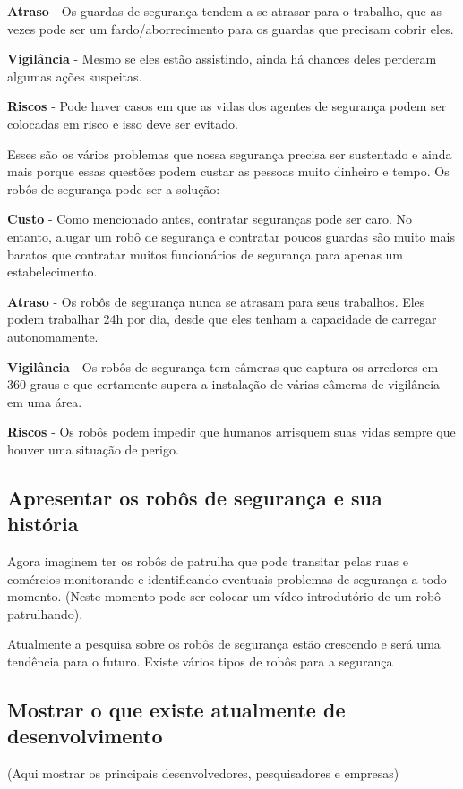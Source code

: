 \documentclass[12pt,a4paper]{article}
\begin{document}
    \textbf{Atraso} - Os guardas de segurança tendem a se atrasar para o trabalho, que as vezes pode ser um fardo/aborrecimento para os guardas que precisam cobrir eles.

    \textbf{Vigilância} - Mesmo se eles estão assistindo, ainda há chances deles perderam algumas ações suspeitas.

    \textbf{Riscos} - Pode haver casos em que as vidas dos agentes de segurança podem ser colocadas em risco e isso deve ser evitado.

    Esses são os vários problemas que nossa segurança precisa ser sustentado e ainda mais porque essas questões podem custar as pessoas muito dinheiro e tempo. Os robôs de segurança pode ser a solução:

    \textbf{Custo} - Como mencionado antes, contratar seguranças pode ser caro. No entanto, alugar um robô de segurança e contratar poucos guardas são muito mais baratos que contratar muitos funcionários de segurança para apenas um estabelecimento.

    \textbf{Atraso} - Os robôs de segurança nunca se atrasam para seus trabalhos. Eles podem trabalhar 24h por dia, desde que eles tenham a capacidade de carregar autonomamente.

    \textbf{Vigilância} - Os robôs de segurança tem câmeras que captura os arredores em 360 graus e que certamente supera a instalação de várias câmeras de vigilância em uma área.

    \textbf{Riscos} - Os robôs podem impedir que humanos arrisquem suas vidas sempre que houver uma situação de perigo.

    \subsection{Apresentar os robôs de segurança e sua história}
    Agora imaginem ter os robôs de patrulha que pode transitar pelas ruas e comércios monitorando e identificando eventuais problemas de segurança a todo momento.  (Neste momento pode ser colocar um vídeo introdutório de um robô patrulhando).

    Atualmente a pesquisa sobre os robôs de segurança estão crescendo e será uma tendência para o futuro. Existe vários tipos de robôs para a segurança

    \subsection{Mostrar o que existe atualmente de desenvolvimento}
    (Aqui mostrar os principais desenvolvedores, pesquisadores e empresas)
    
\end{document}
